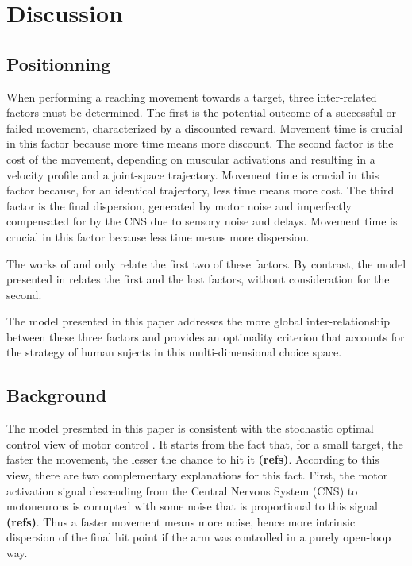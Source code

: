 \documentclass[10pt]{article}
\begin{document}

\section{Discussion}
\label{sec:discu}


\subsection{Positionning}

When performing a reaching movement towards a target, three inter-related factors must be determined. The first is the potential outcome of a successful or failed movement, characterized by a discounted reward. Movement time is crucial in this factor because more time means more discount.
The second factor is the cost of the movement, depending on muscular activations and resulting in a velocity profile and a joint-space trajectory. Movement time is crucial in this factor because, for an identical trajectory, less time means more cost. The third factor is the final dispersion, generated by motor noise and imperfectly compensated for by the CNS due to sensory noise and delays. Movement time is crucial in this factor because less time means more dispersion.

The works of \cite{rigoux12} and \cite{shadmehr10} only relate the first two of these factors. By contrast, the model presented in \cite{Dean2007} relates the first and the last factors, without consideration for the second. 

The model presented in this paper addresses the more global inter-relationship between these three factors and provides an optimality criterion that accounts for the strategy of human sujects in this multi-dimensional choice space.

\subsection{Background}

The model presented in this paper is consistent with the stochastic optimal control view of motor control \cite{harris98_N,todorov02_NN,todorov04_NN,todorov05_NC,li2006}. It starts from the fact that, for a small target, the faster the movement, the lesser the chance to hit it {\bf (refs)}.
According to this view, there are two complementary explanations for this fact. First, the motor activation signal descending from the Central Nervous System (CNS) to motoneurons is corrupted with some noise that is proportional to this signal {\bf (refs)}.
Thus a faster movement means more noise, hence more intrinsic dispersion of the final hit point if the arm was controlled in a purely open-loop way.
\end{document}
